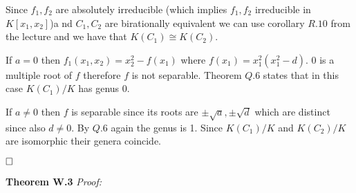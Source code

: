 \documentclass[12pt, a4paper]{article}
\newcommand{\qed}{\hfill\square}
\begin{document}
Since $f_1, f_2$ are absolutely irreducible (which implies $f_1,f_2$ irreducible in $K[x_1,x_2]$)a nd $C_1,C_2$ are birationally equivalent we can use corollary $R.10$ from the lecture and we have that $K(C_1) \cong K(C_2)$.

If $a=0$ then $f_1(x_1,x_2) = x_2^2-f(x_1)$ where $f(x_1) = x_1^2(x_1^2-d)$. $0$ is a multiple root of $f$ therefore $f$ is not separable. Theorem $Q.6$ states that in this case $K(C_1)/K$ has genus 0.

If $a\neq 0$ then $f$ is separable since its roots are $\pm \sqrt{a}, \pm \sqrt{d}$ which are distinct since also $d \neq 0$. By $Q.6$ again the genus is 1. Since $K(C_1)/K$ and $K(C_2)/K$ are isomorphic their genera coincide.

$\qed$

\textbf{Theorem W.3} \textit{Proof:}
\end{document}
